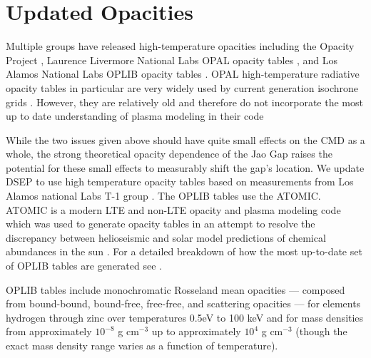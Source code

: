 \section{Updated Opacities}\label{sec:opac}
Multiple groups have released high-temperature opacities including the Opacity
Project \citep[OP][]{Seaton1994}, Laurence Livermore National Labs OPAL opacity
tables \citep{Iglesias1996}, and Los Alamos National Labs OPLIB opacity tables
\citep{Colgan2016}. OPAL high-temperature radiative opacity tables in
particular are very widely used by current generation isochrone grids
\citep[e.g. Dartmouth, MIST, \& StarEvol, ][]{Dotter2008,Choi2016,Amard2019}.
However, they are relatively old and therefore do not incorporate the most up to
date understanding of plasma modeling in their code \citep{Colgan2016}

While the two issues given above should  have quite small effects on the CMD as
a whole, the strong theoretical opacity dependence of the Jao Gap raises the
potential for these small effects to measurably shift the gap's location. We
update DSEP to use high temperature opacity tables based on measurements from
Los Alamos national Labs T-1 group \citep[OPLIB,][]{Colgan2016}. The OPLIB
tables use the ATOMIC. ATOMIC \citep{Magee2004,Hakel2006,Fontes2016} is a
modern LTE and non-LTE opacity and plasma modeling code which was used to
generate opacity tables in an attempt to resolve the discrepancy between
helioseismic and solar model predictions of chemical abundances in the sun
\citep{Bahcall2005}. For a detailed breakdown of how the most up-to-date set of
OPLIB tables are generated see \citep{Colgan2013a, Colgan2013b, Colgan2015,
Colgan2016}.

OPLIB tables include monochromatic Rosseland mean opacities --- composed from
bound-bound, bound-free, free-free, and scattering opacities --- for elements
hydrogen through zinc over temperatures 0.5eV to 100 keV and for mass densities
from approximately $10^{-8}$ g cm$^{-3}$ up to approximately $10^{4}$ g
cm$^{-3}$ (though the exact mass density range varies as a function of
temperature). 

